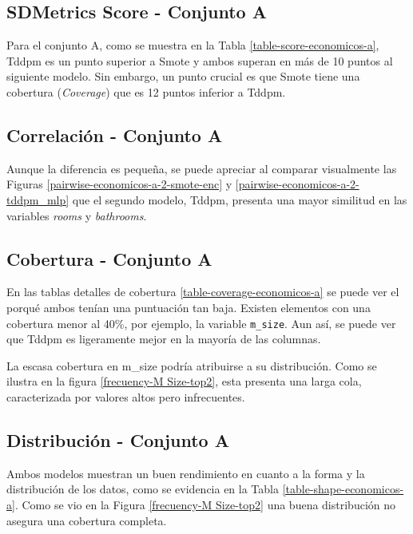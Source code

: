 \newpage
\subsection{SDMetrics Score - Conjunto A}
\label{ds-conjunto-a}
Para el conjunto A, como se muestra en la Tabla \ref{table-score-economicos-a}, Tddpm es un punto superior a Smote y ambos superan en más de 10 puntos al siguiente modelo. Sin embargo, un punto crucial es que Smote tiene una cobertura (\emph{Coverage}) que es 12 puntos inferior a Tddpm.



\newpage
\subsection{Correlación - Conjunto A}
Aunque la diferencia es pequeña, se puede apreciar al comparar visualmente las Figuras \ref{pairwise-economicos-a-2-smote-enc} y \ref{pairwise-economicos-a-2-tddpm_mlp} que el segundo modelo, Tddpm, presenta una mayor similitud en las variables \emph{rooms} y \emph{bathrooms}.




\newpage
\subsection{Cobertura - Conjunto A}
En las tablas detalles de cobertura \ref{table-coverage-economicos-a} se puede ver el porqué ambos tenían una puntuación tan baja. Existen elementos con una cobertura menor al 40\%, por ejemplo, la variable \texttt{m\_size}. Aun así, se puede ver que Tddpm es ligeramente mejor en la mayoría de las columnas.

La escasa cobertura en m\_size podría atribuirse a su distribución. Como se ilustra en la figura \ref{frecuency-M Size-top2}, esta presenta una larga cola, caracterizada por valores altos pero infrecuentes.

\newpage
\subsection{Distribución - Conjunto A}
Ambos modelos muestran un buen rendimiento en cuanto a la forma y la distribución de los datos, como se evidencia en la Tabla \ref{table-shape-economicos-a}. Como se vio en la Figura  \ref{frecuency-M Size-top2} una buena distribución no asegura una cobertura completa.



